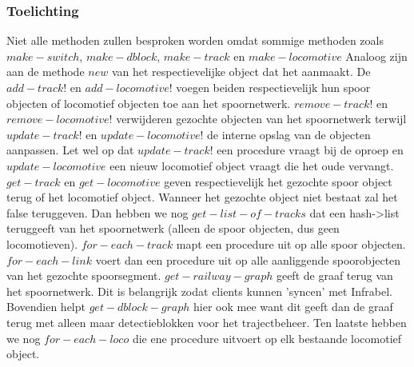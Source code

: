 \documentclass{article}
\begin{document}
\subsubsection{Toelichting}
Niet alle methoden zullen besproken worden omdat sommige methoden zoals $make-switch$, $make-dblock$, $make-track$ en $make-locomotive$
Analoog zijn aan de methode $new$ van het respectievelijke object dat het aanmaakt. De $add-track!$ en $add-locomotive!$ voegen beiden respectievelijk hun spoor objecten of locomotief objecten
toe aan het spoornetwerk. $remove-track!$ en $remove-locomotive!$ verwijderen gezochte objecten van het spoornetwerk terwijl $update-track!$ en $update-locomotive!$ de interne opslag van de objecten aanpassen. 
Let wel op dat $update-track!$ een procedure vraagt bij de oproep en $update-locomotive$ een nieuw locomotief object vraagt die het oude vervangt. $get-track$ en $get-locomotive$ geven respectievelijk het gezochte spoor object terug of het locomotief object. Wanneer het gezochte object niet bestaat zal het false teruggeven.
Dan hebben we nog $get-list-of-tracks$ dat een hash->list teruggeeft van het spoornetwerk (alleen de spoor objecten, dus geen locomotieven). $for-each-track$ mapt een procedure uit op alle spoor objecten. $for-each-link$ voert dan een procedure uit op alle aanliggende 
spoorobjecten van het gezochte spoorsegment. $get-railway-graph$ geeft de graaf terug van het spoornetwerk. Dit is belangrijk zodat clients kunnen 'syncen' met Infrabel. Bovendien helpt $get-dblock-graph$ hier ook mee want 
dit geeft dan de graaf terug met alleen maar detectieblokken voor het trajectbeheer. Ten laatste hebben we nog $for-each-loco$ die ene procedure uitvoert op elk bestaande locomotief object.
\end{document}
